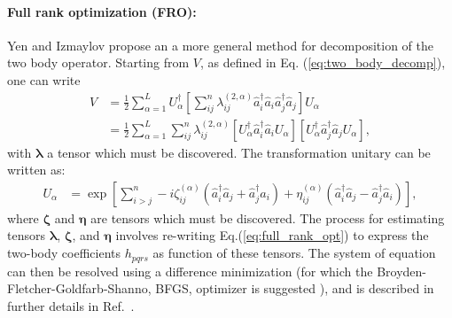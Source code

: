 \paragraph{Full rank optimization (FRO):}
Yen and Izmaylov \cite{Yen2021_Cartan} propose an a more general method for decomposition of the two body operator. Starting from $V$, as defined in Eq. (\ref{eq:two_body_decomp}), one can write
\begin{align} \label{eq:full_rank_opt}
    V &= \frac{1}{2}\sum_{\alpha = 1}^L U_{\alpha}^{\dagger} \left[ \sum_{ij}^n \lambda_{ij}^{(2, \alpha)} \hat{a}^{\dagger}_i\hat{a}_i \hat{a}^{\dagger}_j\hat{a}_j  \right]  U_{\alpha} \nonumber \\
    &= \frac{1}{2}\sum_{\alpha = 1}^L \sum_{ij}^n \lambda_{ij}^{(2, \alpha)} [ U_{\alpha}^{\dagger}\hat{a}^{\dagger}_i\hat{a}_i U_{\alpha}][U_{\alpha}^{\dagger}\hat{a}^{\dagger}_j\hat{a}_j U_{\alpha}],
\end{align}
with $\boldsymbol{\lambda}$ a tensor which must be discovered. The transformation unitary can be written as: 
\begin{align}
    U_{\alpha} &= \exp\left[ \sum_{i>j}^n -i \zeta_{ij}^{(\alpha)} ( \hat{a}_i^{\dagger}\hat{a}_j + \hat{a}_j^{\dagger}\hat{a}_i) +  \eta_{ij}^{(\alpha)} ( \hat{a}_i^{\dagger}\hat{a}_j - \hat{a}_j^{\dagger}\hat{a}_i) \right],
\end{align}
where $\boldsymbol{\zeta}$ and $\boldsymbol{\eta}$ are tensors which must be discovered. The process for estimating tensors  $\boldsymbol{\lambda}$,  $\boldsymbol{\zeta}$, and  $\boldsymbol{\eta}$ involves re-writing Eq.(\ref{eq:full_rank_opt}) to express the two-body coefficients $h_{pqrs}$ as function of these tensors. The system of equation can then be resolved using a difference minimization (for which the Broyden-Fletcher-Goldfarb-Shanno, BFGS, optimizer is suggested \cite{broyden_convergence_1970,fletcher_new_1970,goldfarb_family_1970,shanno_conditioning_1970}), and is described in further details in Ref.~\cite{Yen2021_Cartan}. 

